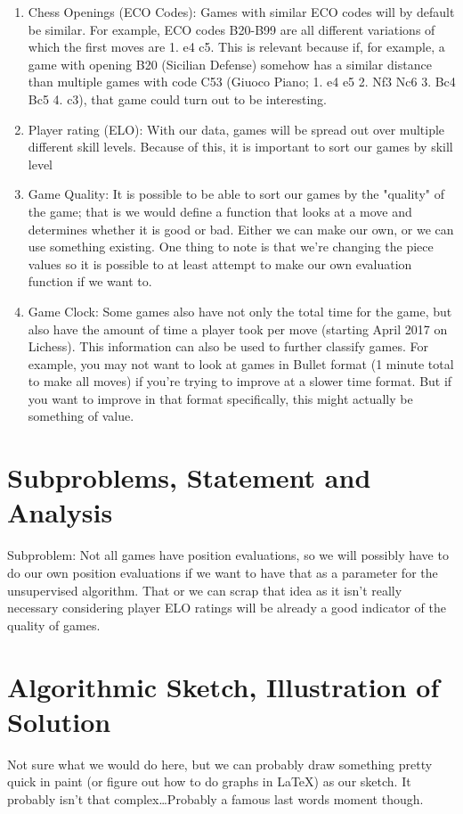 \documentclass[12pt]{article}
\begin{document}
        \begin{enumerate}
            \item Chess Openings (ECO Codes): Games with similar ECO codes will by default be similar. For example, ECO codes B20-B99 are all different variations of which the first moves are 1. e4 c5. This is relevant because if, for example, a game with opening B20 (Sicilian Defense) somehow has a similar distance than multiple games with code C53 (Giuoco Piano; 1. e4 e5 2. Nf3 Nc6 3. Bc4 Bc5 4. c3), that game could turn out to be interesting. 
            \item Player rating (ELO): With our data, games will be spread out over multiple different skill levels. Because of this, it is important to sort our games by skill level 
            \item Game Quality: It is possible to be able to sort our games by the "quality" of the game; that is we would define a function that looks at a move and determines whether it is good or bad. Either we can make our own, or we can use something existing. One thing to note is that we're changing the piece values so it is possible to at least attempt to make our own evaluation function if we want to.
            \item Game Clock: Some games also have not only the total time for the game, but also have the amount of time a player took per move (starting April 2017 on Lichess). This information can also be used to further classify games. For example, you may not want to look at games in Bullet format (1 minute total to make all moves) if you're trying to improve at a slower time format. But if you want to improve in that format specifically, this might actually be something of value.
        \end{enumerate}

    \section{Subproblems, Statement and Analysis}

    Subproblem: Not all games have position evaluations, so we will possibly have to do our own position evaluations if we want to have that as a parameter for the unsupervised algorithm. That or we can scrap that idea as it isn't really necessary considering player ELO ratings will be already a good indicator of the quality of games. 

    \section{Algorithmic Sketch, Illustration of Solution}

    Not sure what we would do here, but we can probably draw something pretty quick in paint (or figure out how to do graphs in \LaTeX) as our sketch. It probably isn't that complex\dots Probably a famous last words moment though.
    
\end{document}
